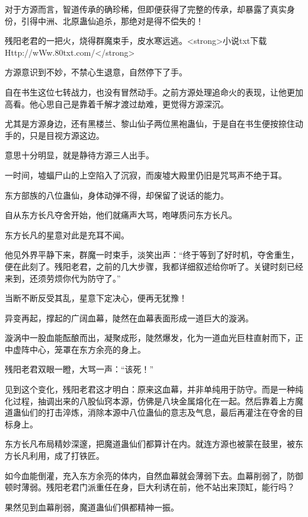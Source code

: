 
\begin{this_body}

对于方源而言，智道传承的确珍稀，但即便获得了完整的传承，却暴露了真实身份，引得中洲、北原蛊仙追杀，那绝对是得不偿失的！

残阳老君的一把火，烧得群魔束手，皮水寒远逃。<strong>小说txt下载Http://wWw.80txt.com/</strong>

方源意识到不妙，不禁心生退意，自然停下了手。

自在书生这位七转战力，也没有冒然动手。之前方源处理追命火的表现，让他更加高看。他心思自己是靠着千解才渡过劫难，更觉得方源深沉。

尤其是方源身边，还有黑楼兰、黎山仙子两位黑袍蛊仙，于是自在书生便按捺住动手的，只是目视方源这边。

意思十分明显，就是静待方源三人出手。

一时间，墟蝠尸山的上空陷入了沉寂，而废墟大殿里仍旧是咒骂声不绝于耳。

东方部族的八位蛊仙，身体动弹不得，却保留了说话的能力。

自从东方长凡夺舍开始，他们就痛声大骂，咆哮质问东方长凡。

东方长凡的星意对此是充耳不闻。

他见外界平静下来，群魔一时束手，淡笑出声：“终于等到了好时机，夺舍重生，便在此刻了。残阳老君，之前的几大步骤，我都详细叙述给你听了。关键时刻已经来到，还须劳烦你代为防守了。”

当断不断反受其乱，星意下定决心，便再无犹豫！

异变再起，撑起的广阔血幕，陡然在血幕表面形成一道巨大的漩涡。

漩涡中一股血能酝酿而出，凝聚成形，陡然爆发，化为一道血光巨柱直射而下，正中虚阵中心，笼罩在东方余亮的身上。

残阳老君双眼一瞪，大骂一声：“该死！”

见到这个变化，残阳老君这才明白：原来这血幕，并非单纯用于防守。而是一种纯化过程，抽调出来的八股仙窍本源，仿佛是八块金属熔化在一起。然后靠着上方魔道蛊仙们的打击淬炼，消除本源中八位蛊仙的意志及气息，最后再灌注在夺舍的目标身上。

东方长凡布局精妙深邃，把魔道蛊仙们都算计在内。就连方源也被蒙在鼓里，被东方长凡利用，成了打铁匠。

如今血能倒灌，充入东方余亮的体内，自然血幕就会薄弱下去。血幕削弱了，防御顿时薄弱。残阳老君门派重任在身，巨大利诱在前，他不站出来顶缸，能行吗？

果然见到血幕削弱，魔道蛊仙们俱都精神一振。


\end{this_body}
